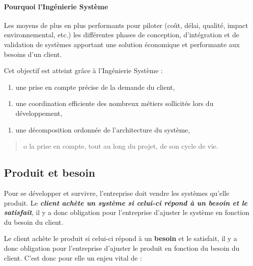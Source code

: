 \paragraph*{Pourquoi l'Ingénierie
Système}\label{pourquoi-linguxe9nierie-systuxe8me}

Les moyens de plus en plus performants pour piloter (coût, délai,
qualité, impact environnemental, etc.) les différentes phases de
conception, d'intégration et de validation de systèmes apportant une
solution économique et performante aux besoins d'un client.

Cet objectif est atteint grâce à l'Ingénierie Système :

\begin{enumerate}
\def\labelenumi{\alph{enumi}.}
\setcounter{enumi}{14}
\item
  une prise en compte précise de la demande du client,
\end{enumerate}

\begin{enumerate}
\def\labelenumi{\alph{enumi}.}
\setcounter{enumi}{14}
\item
  une coordination efficiente des nombreux métiers sollicités lors du
  développement,
\end{enumerate}

\begin{enumerate}
\def\labelenumi{\alph{enumi}.}
\setcounter{enumi}{14}
\item
  une décomposition ordonnée de l'architecture du système,
\end{enumerate}

\begin{quote}
o la prise en compte, tout au long du projet, de son cycle de vie.
\end{quote}

\subsection{Produit et besoin}\label{produit-et-besoin}

Pour se développer et survivre, l'entreprise doit vendre les systèmes
qu'elle produit. Le \emph{\textbf{client achète un système si celui-ci
répond à un besoin et le satisfait}}, il y a donc obligation pour
l'entreprise d'ajuster le système en fonction du besoin du client.

Le client achète le produit si celui-ci répond à un \textbf{besoin} et
le satisfait, il y a donc obligation pour l'entreprise d'ajuster le
produit en fonction du besoin du client. C'est donc pour elle un enjeu
vital de :

